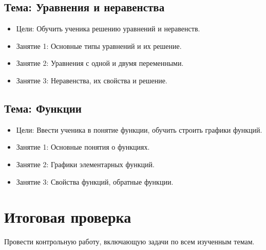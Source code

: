 \documentclass{article}
\begin{document}
\subsection{Тема: Уравнения и неравенства}
\begin{itemize}
    \item Цели: Обучить ученика решению уравнений и неравенств.
    \item Занятие 1: Основные типы уравнений и их решение.
    \item Занятие 2: Уравнения с одной и двумя переменными.
    \item Занятие 3: Неравенства, их свойства и решение.
\end{itemize}

\subsection{Тема: Функции}
\begin{itemize}
    \item Цели: Ввести ученика в понятие функции, обучить строить графики функций.
    \item Занятие 1: Основные понятия о функциях.
    \item Занятие 2: Графики элементарных функций.
    \item Занятие 3: Свойства функций, обратные функции.
\end{itemize}

\section{Итоговая проверка}
Провести контрольную работу, включающую задачи по всем изученным темам.
\end{document}
